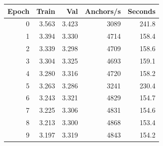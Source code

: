 \begin{tabular}{rrrrr}
\toprule
Epoch & Train & Val & Anchors/s & Seconds \\
\midrule
0 & 3.563 & 3.423 & 3089 & 241.8 \\
1 & 3.394 & 3.330 & 4714 & 158.4 \\
2 & 3.339 & 3.298 & 4709 & 158.6 \\
3 & 3.304 & 3.325 & 4693 & 159.1 \\
4 & 3.280 & 3.316 & 4720 & 158.2 \\
5 & 3.263 & 3.286 & 3241 & 230.4 \\
6 & 3.243 & 3.321 & 4829 & 154.7 \\
7 & 3.225 & 3.306 & 4831 & 154.6 \\
8 & 3.213 & 3.300 & 4868 & 153.4 \\
9 & 3.197 & 3.319 & 4843 & 154.2 \\
\bottomrule
\end{tabular}

